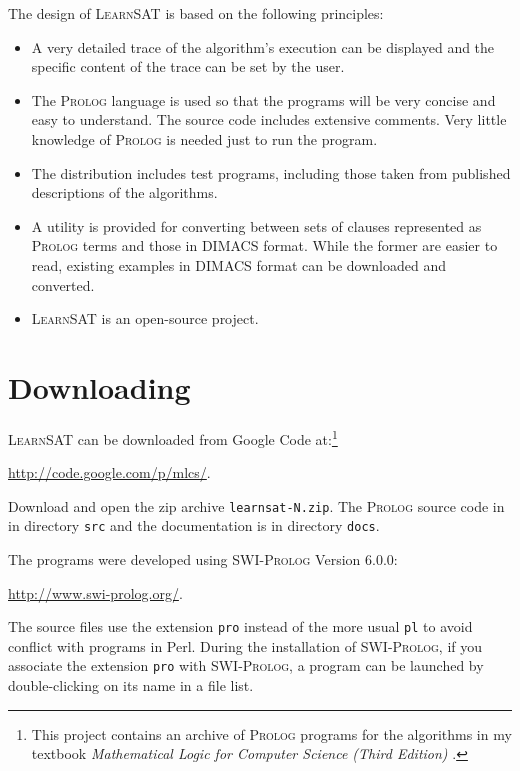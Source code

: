 \documentclass[11pt]{article}
\newcommand*{\p}[1]{\textup{\texttt{#1}}}
\newcommand*{\ls}{\textsc{LearnSAT}}
\newcommand*{\pl}{\textsc{Prolog}}
\newcommand*{\sw}{\textsc{SWI-Prolog}}
\begin{document}
The design of \ls{} is based on the following principles:

\begin{itemize}

\item A very detailed trace of the algorithm's execution can be
displayed and the specific content of the trace can be set by the user.

\item The \pl{} language is used so that the programs will be very
concise and easy to understand. The source code includes extensive
comments. Very little knowledge of \pl{} is needed just to run the
program.

\item The distribution includes test programs, including those taken
from published descriptions of the algorithms.

\item A utility is provided for converting between sets of clauses
represented as \pl{} terms and those in DIMACS format. While the former
are easier to read, existing examples in DIMACS format can be downloaded
and converted.

\item \ls{} is an open-source project.

\end{itemize}

\section{Downloading}
\ls{} can be downloaded from Google Code at:\footnote{This project
contains an archive of \pl{} programs for the algorithms in my textbook
\emph{Mathematical Logic for Computer Science (Third Edition)}
\cite{mlcs}.}
\begin{center}
\url{http://code.google.com/p/mlcs/}.
\end{center}

Download and open the zip archive \p{learnsat-N.zip}. The \pl{} source
code in in directory \p{src} and the documentation is in directory
\p{docs}.

The programs were developed using \sw{} Version 6.0.0:
\begin{center}
\url{http://www.swi-prolog.org/}.
\end{center}
The source files use the extension \p{pro} instead of the more usual
\p{pl} to avoid conflict with programs in Perl. During the installation
of \sw{}, if you associate the extension \p{pro} with \sw{}, a
program can be launched by double-clicking on its name in a file list. 
\end{document}
